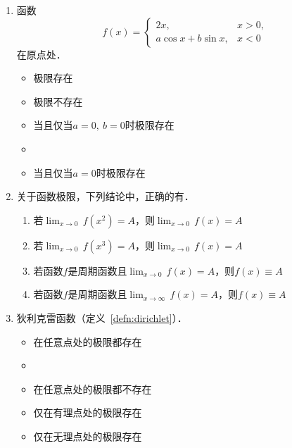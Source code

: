 \begin{enumerate}
\item 函数
  \begin{equation*}
    f(x) =
    \begin{cases}
      2x, & x > 0, \\
      a \cos x + b \sin x, & x < 0
    \end{cases}
  \end{equation*}
  在原点处\uline{\makebox[6em]{}}．
  \begin{itemize}
    \renewcommand{\labelitemi}{\faCircleThin}
  \item 极限存在
  \item 极限不存在
  \item 当且仅当\(a = 0,\ b = 0\)时极限存在
    \ifshowsol
  \item[\faCircle]
    \else
  \item
    \fi
    当且仅当\(a = 0\)时极限存在
  \end{itemize}

\item 关于函数极限，下列结论中，正确的有\uline{}．
  \begin{enumerate}
    \renewcommand{\labelenumii}{\enumparen{\arabic{enumii}}}
  \item 若\(\lim_{x\to0} \,f(x^2) = A\)，则\(\lim_{x\to0} \,f(x) = A\)
  \item 若\(\lim_{x\to0} \,f(x^3) = A\)，则\(\lim_{x\to0} \,f(x) = A\)
  \item 若函数\(f\)是周期函数且\(\lim_{x\to0} \,f(x) = A\)，则\(f(x) \equiv A\)
  \item 若函数\(f\)是周期函数且\(\lim_{x\to\infty} \,f(x) = A\)，则\(f(x) \equiv A\)
  \end{enumerate}

\item 狄利克雷函数（定义~\ref{defn:dirichlet}）\uline{\makebox[6em]{}}．
  \begin{itemize}
    \renewcommand{\labelitemi}{\faCircleThin}
  \item 在任意点处的极限都存在
    \ifshowsol
  \item[\faCircle]
    \else
  \item
    \fi
    在任意点处的极限都不存在
  \item 仅在有理点处的极限存在
  \item 仅在无理点处的极限存在
  \end{itemize}


\end{enumerate}
